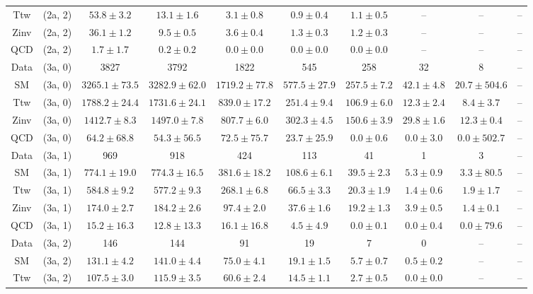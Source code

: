 \begin{table}[h!]
{\begin{tabular}{cccccccccc}
	Ttw & (2a, 2) & $53.8\pm 3.2$ & $13.1\pm 1.6$ & $3.1\pm 0.8$ & $0.9\pm 0.4$ & $1.1\pm 0.5$ & -- & -- & -- \\[0.5ex] 
	Zinv & (2a, 2) & $36.1\pm 1.2$ & $9.5\pm 0.5$ & $3.6\pm 0.4$ & $1.3\pm 0.3$ & $1.2\pm 0.3$ & -- & -- & -- \\[0.5ex] 
	QCD & (2a, 2) & $1.7\pm 1.7$ & $0.2\pm 0.2$ & $0.0\pm 0.0$ & $0.0\pm 0.0$ & $0.0\pm 0.0$ & -- & -- & -- \\[0.5ex] 
	Data & (3a, 0) & 3827 & 3792 & 1822 & 545 & 258 & 32 & 8 & -- \\[0.5ex] 
	SM & (3a, 0) & $3265.1\pm 73.5$ & $3282.9\pm 62.0$ & $1719.2\pm 77.8$ & $577.5\pm 27.9$ & $257.5\pm 7.2$ & $42.1\pm 4.8$ & $20.7\pm 504.6$ & -- \\[0.5ex] 
	Ttw & (3a, 0) & $1788.2\pm 24.4$ & $1731.6\pm 24.1$ & $839.0\pm 17.2$ & $251.4\pm 9.4$ & $106.9\pm 6.0$ & $12.3\pm 2.4$ & $8.4\pm 3.7$ & -- \\[0.5ex] 
	Zinv & (3a, 0) & $1412.7\pm 8.3$ & $1497.0\pm 7.8$ & $807.7\pm 6.0$ & $302.3\pm 4.5$ & $150.6\pm 3.9$ & $29.8\pm 1.6$ & $12.3\pm 0.4$ & -- \\[0.5ex] 
	QCD & (3a, 0) & $64.2\pm 68.8$ & $54.3\pm 56.5$ & $72.5\pm 75.7$ & $23.7\pm 25.9$ & $0.0\pm 0.6$ & $0.0\pm 3.0$ & $0.0\pm 502.7$ & -- \\[0.5ex] 
	Data & (3a, 1) & 969 & 918 & 424 & 113 & 41 & 1 & 3 & -- \\[0.5ex] 
	SM & (3a, 1) & $774.1\pm 19.0$ & $774.3\pm 16.5$ & $381.6\pm 18.2$ & $108.6\pm 6.1$ & $39.5\pm 2.3$ & $5.3\pm 0.9$ & $3.3\pm 80.5$ & -- \\[0.5ex] 
	Ttw & (3a, 1) & $584.8\pm 9.2$ & $577.2\pm 9.3$ & $268.1\pm 6.8$ & $66.5\pm 3.3$ & $20.3\pm 1.9$ & $1.4\pm 0.6$ & $1.9\pm 1.7$ & -- \\[0.5ex] 
	Zinv & (3a, 1) & $174.0\pm 2.7$ & $184.2\pm 2.6$ & $97.4\pm 2.0$ & $37.6\pm 1.6$ & $19.2\pm 1.3$ & $3.9\pm 0.5$ & $1.4\pm 0.1$ & -- \\[0.5ex] 
	QCD & (3a, 1) & $15.2\pm 16.3$ & $12.8\pm 13.3$ & $16.1\pm 16.8$ & $4.5\pm 4.9$ & $0.0\pm 0.1$ & $0.0\pm 0.4$ & $0.0\pm 79.6$ & -- \\[0.5ex] 
	Data & (3a, 2) & 146 & 144 & 91 & 19 & 7 & 0 & -- & -- \\[0.5ex] 
	SM & (3a, 2) & $131.1\pm 4.2$ & $141.0\pm 4.4$ & $75.0\pm 4.1$ & $19.1\pm 1.5$ & $5.7\pm 0.7$ & $0.5\pm 0.2$ & -- & -- \\[0.5ex] 
	Ttw & (3a, 2) & $107.5\pm 3.0$ & $115.9\pm 3.5$ & $60.6\pm 2.4$ & $14.5\pm 1.1$ & $2.7\pm 0.5$ & $0.0\pm 0.0$ & -- & -- \\[0.5ex] 

\end{tabular}}
\end{table}
